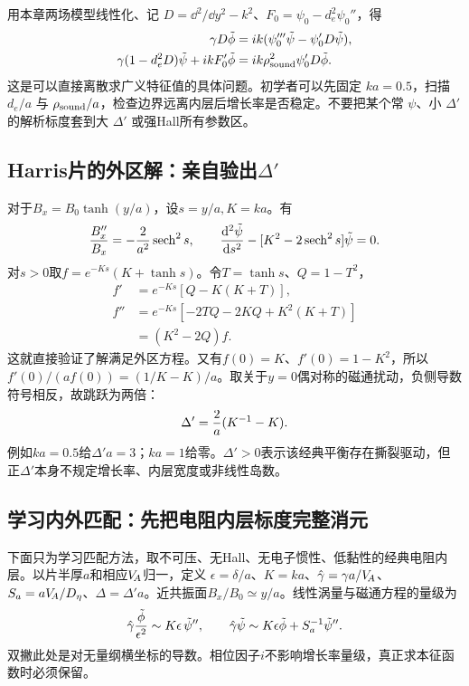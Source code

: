 \documentclass[UTF8,a4paper,11pt,openany,fontset=fandol]{ctexbook}
\begin{document}
用本章两场模型线性化、记 $D=\dd^2/\dd y^2-k^2$、$F_0=\psi_0-d_e^2\psi_0''$，得
\begin{align}
\gamma D\tilde\phi&=ik(\psi_0'''\tilde\psi-\psi_0'D\tilde\psi),\\
\gamma(1-d_e^2D)\tilde\psi+ikF_0'\tilde\phi&=ik\rho_{\rm sound}^2\psi_0'D\tilde\phi.
\end{align}
这是可以直接离散求广义特征值的具体问题。初学者可以先固定 $ka=0.5$，扫描 $d_e/a$ 与 $\rho_{\rm sound}/a$，检查边界远离内层后增长率是否稳定。不要把某个常 $\psi$、小 $\Delta'$ 的解析标度套到大 $\Delta'$ 或强Hall所有参数区。

\subsection{Harris片的外区解：亲自验出$\Delta'$}
对于$B_x=B_0\tanh(y/a)$，设$s=y/a,K=ka$。有
\begin{equation}
 {B_x''\over B_x}=-{2\over a^2}\operatorname{sech}^2s,\qquad
 {\mathrm d^2\tilde\psi\over\mathrm ds^2}
 -[K^2-2\operatorname{sech}^2s]\tilde\psi=0.
\end{equation}
对$s>0$取$f=e^{-Ks}(K+\tanh s)$。令$T=\tanh s$、$Q=1-T^2$，
\begin{align}
 f'&=e^{-Ks}[Q-K(K+T)],\\
 f''&=e^{-Ks}[-2TQ-2KQ+K^2(K+T)]\\
 &=(K^2-2Q)f.
\end{align}
这就直接验证了解满足外区方程。又有$f(0)=K$、$f'(0)=1-K^2$，所以
$f'(0)/(af(0))=(1/K-K)/a$。取关于$y=0$偶对称的磁通扰动，负侧导数符号相反，故跳跃为两倍：
\begin{equation}
 \Delta'={2\over a}(K^{-1}-K).
\end{equation}
例如$ka=0.5$给$\Delta'a=3$；$ka=1$给零。$\Delta'>0$表示该经典平衡存在撕裂驱动，但正$\Delta'$本身不规定增长率、内层宽度或非线性岛数。

\subsection{学习内外匹配：先把电阻内层标度完整消元}
下面只为学习匹配方法，取不可压、无Hall、无电子惯性、低黏性的经典电阻内层。以片半厚$a$和相应$V_{\!A}$归一，定义
$\epsilon=\delta/a$、$K=ka$、$\hat\gamma=\gamma a/V_{\!A}$、$S_a=aV_{\!A}/D_\eta$、$\Delta=\Delta'a$。近共振面$B_x/B_0\simeq y/a$。线性涡量与磁通方程的量级为
\begin{equation}
 \hat\gamma{\tilde\phi\over\epsilon^2}
 \sim K\epsilon\,\tilde\psi'',\qquad
 \hat\gamma\tilde\psi\sim K\epsilon\tilde\phi+S_a^{-1}\tilde\psi''.
\end{equation}
双撇此处是对无量纲横坐标的导数。相位因子$i$不影响增长率量级，真正求本征函数时必须保留。
\end{document}
